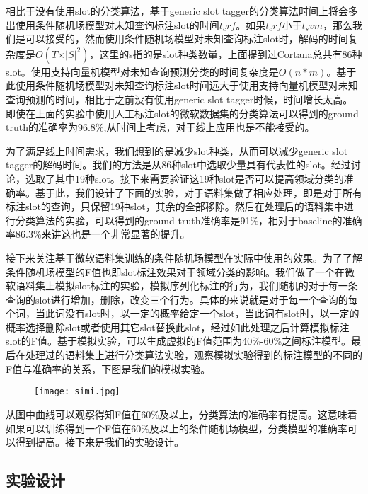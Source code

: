 \documentclass[master]{njuthesis}
\begin{document}
    相比于没有使用slot的分类算法，基于generic slot tagger的分类算法时间上将会多出使用条件随机场模型对未知查询标注slot的时间$t_crf$。如果$t_crf$小于$t_svm$，那么我们是可以接受的，然而使用条件随机场模型对未知查询标注slot时，解码的时间复杂度是$O\left(T\times\vert S \vert^2\right)$，这里的s指的是slot种类数量，上面提到过Cortana总共有86种slot。使用支持向量机模型对未知查询预测分类的时间复杂度是$O\left(n*m\right)$。基于此使用条件随机场模型对未知查询标注slot时间远大于使用支持向量机模型对未知查询预测的时间，相比于之前没有使用generic slot tagger时候，时间增长太高。即使在上面的实验中使用人工标注slot的微软数据集的分类算法可以得到的ground truth的准确率为96.8\%,从时间上考虑，对于线上应用也是不能接受的。

    为了满足线上时间需求，我们想到的是减少slot种类，从而可以减少generic slot tagger的解码时间。我们的方法是从86种slot中选取少量具有代表性的slot。经过讨论，选取了其中19种slot。接下来需要验证这19种slot是否可以提高领域分类的准确率。基于此，我们设计了下面的实验，对于语料集做了相应处理，即是对于所有标注slot的查询，只保留19种slot，其余的全部移除。然后在处理后的语料集中进行分类算法的实验，可以得到的ground truth准确率是91\%，相对于baseline的准确率86.3\%来讲这也是一个非常显著的提升。
    
    接下来关注基于微软语料集训练的条件随机场模型在实际中使用的效果。为了了解条件随机场模型的F值也即slot标注效果对于领域分类的影响。我们做了一个在微软语料集上模拟slot标注的实验，模拟序列化标注的行为，我们随机的对于每一条查询的slot进行增加，删除，改变三个行为。具体的来说就是对于每一个查询的每个词，当此词没有slot时，以一定的概率给定一个slot，当此词有slot时，以一定的概率选择删除slot或者使用其它slot替换此slot，经过如此处理之后计算模拟标注slot的F值。基于模拟实验，可以生成虚拟的F值范围为40\%-60\%之间标注模型。最后在处理过的语料集上进行分类算法实验，观察模拟实验得到的标注模型的不同的F值与准确率的关系，下图是我们的模拟实验。
    
    \begin{figure}[htbp]
      \centering
      \texttt{[image: simi.jpg]}
      \caption{}\label{fig:test1}
    \end{figure}

    
    从图中曲线可以观察得知F值在60\%及以上，分类算法的准确率有提高。这意味着如果可以训练得到一个F值在60\%及以上的条件随机场模型，分类模型的准确率可以得到提高。接下来是我们的实验设计。

\subsection{实验设计}
\end{document}
